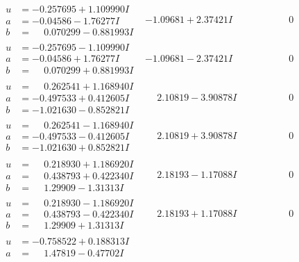 \documentclass[1p]{elsarticle_modified}
\theoremstyle{definition}
\begin{document}
$$\begin{array}{c|c|c}
\begin{aligned}
u &= -0.257695 + 1.109990 I \\
a &= -0.04586 - 1.76277 I \\
b &= \phantom{-}0.070299 - 0.881993 I\end{aligned}
 & -1.09681 + 2.37421 I & \phantom{-0.000000 } 0 \\ \hline\begin{aligned}
u &= -0.257695 - 1.109990 I \\
a &= -0.04586 + 1.76277 I \\
b &= \phantom{-}0.070299 + 0.881993 I\end{aligned}
 & -1.09681 - 2.37421 I & \phantom{-0.000000 } 0 \\ \hline\begin{aligned}
u &= \phantom{-}0.262541 + 1.168940 I \\
a &= -0.497533 + 0.412605 I \\
b &= -1.021630 - 0.852821 I\end{aligned}
 & \phantom{-}2.10819 - 3.90878 I & \phantom{-0.000000 } 0 \\ \hline\begin{aligned}
u &= \phantom{-}0.262541 - 1.168940 I \\
a &= -0.497533 - 0.412605 I \\
b &= -1.021630 + 0.852821 I\end{aligned}
 & \phantom{-}2.10819 + 3.90878 I & \phantom{-0.000000 } 0 \\ \hline\begin{aligned}
u &= \phantom{-}0.218930 + 1.186920 I \\
a &= \phantom{-}0.438793 + 0.422340 I \\
b &= \phantom{-}1.29909 - 1.31313 I\end{aligned}
 & \phantom{-}2.18193 - 1.17088 I & \phantom{-0.000000 } 0 \\ \hline\begin{aligned}
u &= \phantom{-}0.218930 - 1.186920 I \\
a &= \phantom{-}0.438793 - 0.422340 I \\
b &= \phantom{-}1.29909 + 1.31313 I\end{aligned}
 & \phantom{-}2.18193 + 1.17088 I & \phantom{-0.000000 } 0 \\ \hline\begin{aligned}
u &= -0.758522 + 0.188313 I \\
a &= \phantom{-}1.47819 - 0.47702 I \\

\end{aligned}
\end{array}$$
\end{document}
